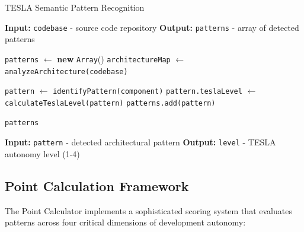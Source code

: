 \documentclass[10pt]{article}
\begin{document}
\begin{algorithm}[H]
\caption{TESLA Semantic Pattern Recognition}
\label{algo:pattern-recognition}
\begin{algorithmic}[1]
    \State \textbf{Input:} \texttt{codebase} - source code repository
    \State \textbf{Output:} \texttt{patterns} - array of detected patterns
    
    \State \texttt{patterns} $\gets$ \textbf{new} \texttt{Array}()
    \State \texttt{architectureMap} $\gets$ \texttt{analyzeArchitecture(codebase)}
    
        \State \texttt{pattern} $\gets$ \texttt{identifyPattern(component)}
            \State \texttt{pattern.teslaLevel} $\gets$ \texttt{calculateTeslaLevel(pattern)}
            \State \texttt{patterns.add(pattern)}
        \EndIf
    \EndFor
    
    \State \Return \texttt{patterns}
\EndFunction

    \State \textbf{Input:} \texttt{pattern} - detected architectural pattern
    \State \textbf{Output:} \texttt{level} - TESLA autonomy level (1-4)
    
        \State {}
        \State {}
        \State {}
        \State {}
    \Else
        \State {}
    \EndIf
\EndFunction
\end{algorithmic}
\end{algorithm}

\subsection{Point Calculation Framework}

The Point Calculator implements a sophisticated scoring system that evaluates patterns across four critical dimensions of development autonomy:
\end{document}
